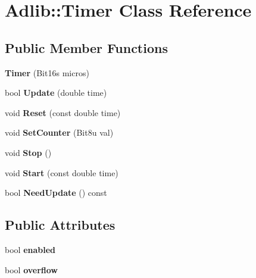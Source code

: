 \hypertarget{classAdlib_1_1Timer}{\section{Adlib\-:\-:Timer Class Reference}
\label{classAdlib_1_1Timer}
}
\subsection*{Public Member Functions}
\begin{DoxyCompactItemize}
\item 
\hypertarget{classAdlib_1_1Timer_a464fc72748d8b1397d5c18af9311ca2e}{{\bfseries Timer} (Bit16s micros)}\label{classAdlib_1_1Timer_a464fc72748d8b1397d5c18af9311ca2e}

\item 
\hypertarget{classAdlib_1_1Timer_ac1bcebc4ee0814f7ac0230a434822caa}{bool {\bfseries Update} (double time)}\label{classAdlib_1_1Timer_ac1bcebc4ee0814f7ac0230a434822caa}

\item 
\hypertarget{classAdlib_1_1Timer_a2996783a1b56aa8413731d3a1776dec7}{void {\bfseries Reset} (const double time)}\label{classAdlib_1_1Timer_a2996783a1b56aa8413731d3a1776dec7}

\item 
\hypertarget{classAdlib_1_1Timer_ada967b3f9174205db219442ef31f3836}{void {\bfseries Set\-Counter} (Bit8u val)}\label{classAdlib_1_1Timer_ada967b3f9174205db219442ef31f3836}

\item 
\hypertarget{classAdlib_1_1Timer_abaa9e04459e2e7a380f603b5ae33a466}{void {\bfseries Stop} ()}\label{classAdlib_1_1Timer_abaa9e04459e2e7a380f603b5ae33a466}

\item 
\hypertarget{classAdlib_1_1Timer_a0d1b88747314c8004a7b96f161b09a7a}{void {\bfseries Start} (const double time)}\label{classAdlib_1_1Timer_a0d1b88747314c8004a7b96f161b09a7a}

\item 
\hypertarget{classAdlib_1_1Timer_ab693e16e46b4c027c1660e06b2129732}{bool {\bfseries Need\-Update} () const }\label{classAdlib_1_1Timer_ab693e16e46b4c027c1660e06b2129732}

\end{DoxyCompactItemize}
\subsection*{Public Attributes}
\begin{DoxyCompactItemize}
\item 
\hypertarget{classAdlib_1_1Timer_a2f108491d0950e7efb94e414683bd754}{bool {\bfseries enabled}}\label{classAdlib_1_1Timer_a2f108491d0950e7efb94e414683bd754}

\item 
\hypertarget{classAdlib_1_1Timer_addc01cad0bac2f3b3d8759626c806c6a}{bool {\bfseries overflow}}\label{classAdlib_1_1Timer_addc01cad0bac2f3b3d8759626c806c6a}

\end{DoxyCompactItemize}


